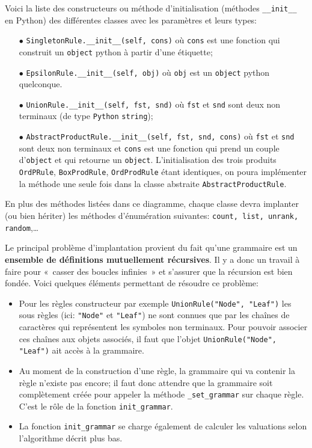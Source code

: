 \documentclass[11pt]{article}
\renewcommand{\emph}[1]{\textbf{#1}}
\newcommand{\Python}{\texttt{Python}}
\begin{document}
Voici la liste des constructeurs ou méthode d'initialisation (méthodes
\verb+__init__+ en Python) des différentes classes avec les paramètres et
leurs types:
\medskip

\begin{itemize}
\item[$\bullet$] \verb+SingletonRule.__init__(self, cons)+ où \texttt{cons} est
  une fonction qui construit un \texttt{object} python à partir d'une
  étiquette;
\medskip
\item[$\bullet$] \verb+EpsilonRule.__init__(self, obj)+ où \texttt{obj} est un
  \texttt{object} python quelconque.
\medskip
\item[$\bullet$] \verb+UnionRule.__init__(self, fst, snd)+ où \texttt{fst} et
  \texttt{snd} sont deux non terminaux (de type \Python{} \texttt{string});
\medskip
\item[$\bullet$] \verb+AbstractProductRule.__init__(self, fst, snd, cons)+ où
  \texttt{fst} et \texttt{snd} sont deux non terminaux et \texttt{cons} est
  une fonction qui prend un couple d'\texttt{object} et qui retourne un
  \texttt{object}. L'initialisation des trois produits \verb+OrdPRule+,
  \verb+BoxProdRule+, \verb+OrdProdRule+ étant
  identiques, on poura implémenter la méthode une seule fois dans la classe
  abstraite \verb+AbstractProductRule+.
\medskip
\end{itemize}
En plus des méthodes listées dans ce diagramme, chaque classe devra implanter
(ou bien hériter) les méthodes d'énumération suivantes: \texttt{count, list,
  unrank, random},\dots

Le principal problème d'implantation provient du fait qu'une grammaire est un
\emph{ensemble de définitions mutuellement récursives}. Il y a donc un travail
à faire pour «~casser des boucles infinies~» et s'assurer que la récursion est
bien fondée. Voici quelques éléments permettant de résoudre ce problème:
\begin{itemize}
\item Pour les règles constructeur par exemple
  \verb+UnionRule("Node", "Leaf")+ les sous règles (ici: \verb+"Node"+ et
  \verb+"Leaf"+) ne sont connues que par les chaînes de caractères qui
  représentent les symboles non terminaux. Pour pouvoir associer ces chaînes
  aux objets associés, il faut que l'objet \verb+UnionRule("Node", "Leaf")+
  ait accès à la grammaire.
\item Au moment de la construction d'une règle, la grammaire qui va contenir
  la règle n'existe pas encore; il faut donc attendre que la grammaire soit
  complètement créée pour appeler la méthode \texttt{\_set\_grammar} sur
  chaque règle. C'est le rôle de la fonction \texttt{init\_grammar}.
\item La fonction \texttt{init\_grammar} se charge également de calculer les
  valuations selon l'algorithme décrit plus bas.
\end{itemize}
\medskip
\end{document}
